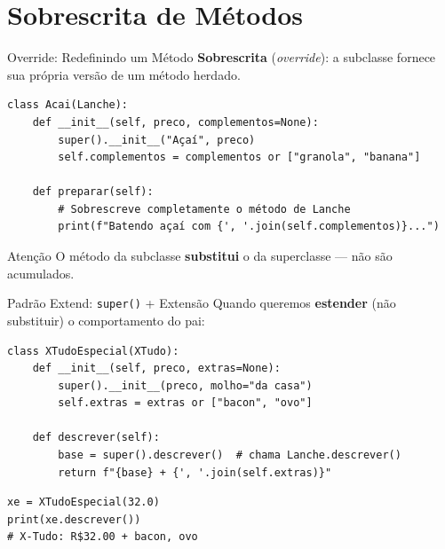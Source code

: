 \documentclass[aspectratio=169]{beamer}
\begin{document}
\section{Sobrescrita de Métodos}

\begin{frame}[fragile]{Override: Redefinindo um Método}
  \textbf{Sobrescrita} (\emph{override}): a subclasse fornece sua própria versão de um método herdado.

  \begin{lstlisting}
class Acai(Lanche):
    def __init__(self, preco, complementos=None):
        super().__init__("Açaí", preco)
        self.complementos = complementos or ["granola", "banana"]

    def preparar(self):
        # Sobrescreve completamente o método de Lanche
        print(f"Batendo açaí com {', '.join(self.complementos)}...")
  \end{lstlisting}

  \begin{alertblock}{Atenção}
    O método da subclasse \textbf{substitui} o da superclasse — não são acumulados.
  \end{alertblock}
\end{frame}

\begin{frame}[fragile]{Padrão Extend: \texttt{super()} + Extensão}
  Quando queremos \textbf{estender} (não substituir) o comportamento do pai:

  \begin{lstlisting}
class XTudoEspecial(XTudo):
    def __init__(self, preco, extras=None):
        super().__init__(preco, molho="da casa")
        self.extras = extras or ["bacon", "ovo"]

    def descrever(self):
        base = super().descrever()  # chama Lanche.descrever()
        return f"{base} + {', '.join(self.extras)}"
  \end{lstlisting}

  \begin{lstlisting}
xe = XTudoEspecial(32.0)
print(xe.descrever())
# X-Tudo: R$32.00 + bacon, ovo
  \end{lstlisting}
\end{frame}
\end{document}
